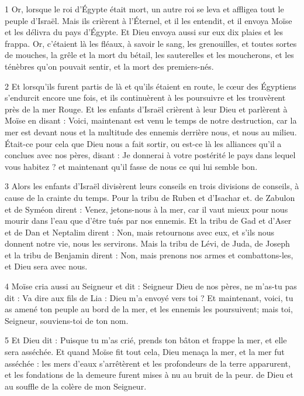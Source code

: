 
\par 1 Or, lorsque le roi d'Égypte était mort, un autre roi se leva et affligea tout le peuple d'Israël. Mais ils crièrent à l'Éternel, et il les entendit, et il envoya Moïse et les délivra du pays d'Égypte. Et Dieu envoya aussi sur eux dix plaies et les frappa. Or, c'étaient là les fléaux, à savoir le sang, les grenouilles, et toutes sortes de mouches, la grêle et la mort du bétail, les sauterelles et les moucherons, et les ténèbres qu'on pouvait sentir, et la mort des premiers-nés.

\par 2 Et lorsqu'ils furent partis de là et qu'ils étaient en route, le cœur des Égyptiens s'endurcit encore une fois, et ils continuèrent à les poursuivre et les trouvèrent près de la mer Rouge. Et les enfants d'Israël crièrent à leur Dieu et parlèrent à Moïse en disant : Voici, maintenant est venu le temps de notre destruction, car la mer est devant nous et la multitude des ennemis derrière nous, et nous au milieu. Était-ce pour cela que Dieu nous a fait sortir, ou est-ce là les alliances qu'il a conclues avec nos pères, disant : Je donnerai à votre postérité le pays dans lequel vous habitez ? et maintenant qu'il fasse de nous ce qui lui semble bon.

\par 3 Alors les enfants d'Israël divisèrent leurs conseils en trois divisions de conseils, à cause de la crainte du temps. Pour la tribu de Ruben et d'Isachar et. de Zabulon et de Syméon dirent : Venez, jetons-nous à la mer, car il vaut mieux pour nous mourir dans l'eau que d'être tués par nos ennemis. Et la tribu de Gad et d'Aser et de Dan et Neptalim dirent : Non, mais retournons avec eux, et s'ils nous donnent notre vie, nous les servirons. Mais la tribu de Lévi, de Juda, de Joseph et la tribu de Benjamin dirent : Non, mais prenons nos armes et combattons-les, et Dieu sera avec nous.

\par 4 Moïse cria aussi au Seigneur et dit : Seigneur Dieu de nos pères, ne m'as-tu pas dit : Va dire aux fils de Lia : Dieu m'a envoyé vers toi ? Et maintenant, voici, tu as amené ton peuple au bord de la mer, et les ennemis les poursuivent; mais toi, Seigneur, souviens-toi de ton nom.

\par 5 Et Dieu dit : Puisque tu m'as crié, prends ton bâton et frappe la mer, et elle sera asséchée. Et quand Moïse fit tout cela, Dieu menaça la mer, et la mer fut asséchée : les mers d'eaux s'arrêtèrent et les profondeurs de la terre apparurent, et les fondations de la demeure furent mises à nu au bruit de la peur. de Dieu et au souffle de la colère de mon Seigneur.

